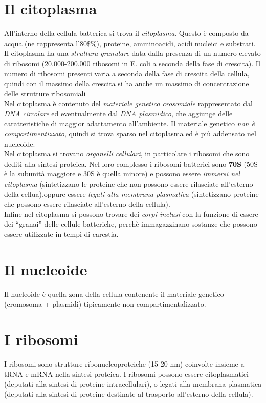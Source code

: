 \documentclass[11pt]{book}
\begin{document}
\section{Il citoplasma}
All'interno della cellula batterica si trova il \emph{citoplasma}. Questo è composto da acqua (ne rappresenta l'80$\$\%$), proteine, amminoacidi, acidi nucleici e substrati.\\
Il citoplasma ha una \emph{struttura granulare} data dalla presenza di un numero elevato di ribosomi (20.000-200.000 ribosomi in E. coli a seconda della fase di crescita). Il numero di ribosomi presenti varia a seconda della fase di crescita della cellula, quindi con il massimo della crescita si ha anche un massimo di concentrazione delle strutture ribosomiali \\
Nel citoplasma è contenuto del \emph{materiale genetico crosomiale} rappresentato dal \emph{DNA circolare} ed eventualmente dal \emph{DNA plasmidico}, che aggiunge delle caratteristiche di maggior adattamento all'ambiente. Il materiale genetico \emph{non è compartimentizzato}, quindi si trova sparso nel citoplasma ed è più addensato nel nucleoide.\\
Nel citoplasma si trovano \emph{organelli cellulari}, in particolare i ribosomi che sono dediti alla sintesi proteica. Nel loro complesso i ribosomi batterici sono \textbf{70S} (50S è la subunità maggiore e 30S è quella minore) e possono essere \emph{immersi nel citoplasma} (sintetizzano le proteine che non possono essere rilasciate all'esterno della cellua),oppure essere \emph{legati alla membrana plasmatica} (sintetizzano proteine che possono essere rilasciate all'esterno della cellula).\\
Infine nel citoplasma si possono trovare dei \emph{corpi inclusi} con la funzione di essere dei ``granai'' delle cellule batteriche, perchè immagazzinano sostanze che possono essere utilizzate in tempi di carestia.


\section{Il nucleoide}
Il nucleoide è quella zona della cellula contenente il materiale genetico (cromosoma + plasmidi) tipicamente non compartimentalizzato. 

\section{I ribosomi}
I ribosomi sono strutture ribonucleoproteiche (15-20 nm) coinvolte insieme a tRNA e mRNA nella sintesi proteica. I ribosomi possono essere citoplasmatici (deputati alla sintesi di proteine intracellulari), o legati alla membrana plasmatica (deputati alla sintesi di proteine destinate al trasporto all’esterno della cellula).
\end{document}
